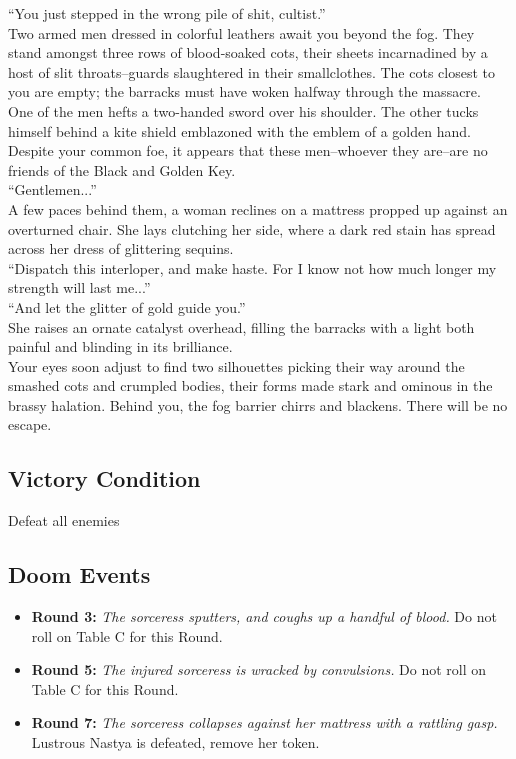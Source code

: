 “You just stepped in the wrong pile of shit, cultist.”\\

Two armed men dressed in colorful leathers await you beyond the fog. They stand amongst three rows of blood-soaked cots, their sheets incarnadined by a host of slit throats--guards slaughtered in their smallclothes. The cots closest to you are empty; the barracks must have woken halfway through the massacre.\\

One of the men hefts a two-handed sword over his shoulder. The other tucks himself behind a kite shield emblazoned with the emblem of a golden hand. Despite your common foe, it appears that these men--whoever they are--are no friends of the Black and Golden Key.\\

“Gentlemen...”\\

A few paces behind them, a woman reclines on a mattress propped up against an overturned chair. She lays clutching her side, where a dark red stain has spread across her dress of glittering sequins.\\

“Dispatch this interloper, and make haste. For I know not how much longer my strength will last me...”\\

“And let the glitter of gold guide you.”\\
She raises an ornate catalyst overhead, filling the barracks with a light both painful and blinding in its brilliance.\\

Your eyes soon adjust to find two silhouettes picking their way around the smashed cots and crumpled bodies, their forms made stark and ominous in the brassy halation. Behind you, the fog barrier chirrs and blackens. There will be no escape.\\

\subsection*{Victory Condition}
Defeat all enemies

\begin{tcolorbox}
\subsection*{Doom Events}
\begin{itemize}
\item \textbf{Round 3:} \emph{The sorceress sputters, and coughs up a handful of blood.} Do not roll on Table C for this Round.
\item \textbf{Round 5:} \emph{The injured sorceress is wracked by convulsions.} Do not roll on Table C for this Round.
\item \textbf{Round 7:} \emph{The sorceress collapses against her mattress with a rattling gasp.} Lustrous Nastya is defeated, remove her token.
\end{itemize}
\end{tcolorbox}


